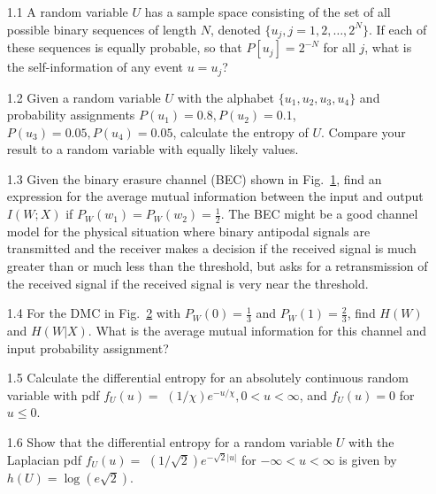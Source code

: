 \begin{itemize}

\item[1.1]
A random variable $U$ has a sample space consisting of the set
of all possible binary sequences of length $N$, denoted
$\{u_j, j=1, 2, \ldots, 2^N \}$.
If each of these sequences is equally probable,
so that $P [ u_j ] = 2^{-N}$ for all $j$, what is the self-information
of any event $u=u_j$?


\item[1.2]
Given a random variable $U$ with the alphabet $\{ u_1, u_2, u_3, u_4 \}$
and probability assignments $P(u_1) = 0.8, P(u_2)=0.1$,
$P(u_3) = 0.05, P(u_4)=0.05$, calculate the entropy of $U$.
Compare your result to a random variable with equally likely values.

\item[1.3]
Given the binary erasure channel (BEC) shown in Fig.~\ref{ch01.figP11.3},
find an expression for the average mutual information between
the input and output $I(W; X)$ if $P_W(w_1) = P_W (w_2) = \tfrac{1}{2}$.
The BEC might be a good channel model for the physical situation where
binary antipodal signals are transmitted and the receiver makes a decision
if the received signal is much greater than or much less than the
threshold, but asks for a retransmission of the received signal if the
received signal is very near the threshold.

\begin{figure}%
 \figboxes
\caption{
\label{ch01.figP11.3} }
\end{figure}


\item[1.4]
For the DMC in Fig.~\ref{ch01.figP11.4} with $P_W(0)=\tfrac{1}{3}$
and $P_W(1)=\tfrac{2}{3}$, find $H(W)$ and $H(W|X)$. What is the
average mutual information for this channel and input probability assignment?

\begin{figure}%
 \figboxes
\caption{
\label{ch01.figP11.4} }
\end{figure}

\item[1.5]
Calculate the differential entropy for an absolutely continuous random
variable with pdf
$f_U(u)=$ $(1/\chi) e^{-u/\chi}, 0<u<\infty$,
and $f_U (u)= 0$ for $u\leq 0$.

\item[1.6]
Show that the differential entropy for a random variable $U$ with
the Laplacian pdf
$f_U (u)=$  $(1/\sqrt{2}) e^{ -\sqrt{2}|u| }$ for
$-\infty < u < \infty $ is given by $h(U)= \log (e\sqrt{2})$.


\end{itemize}
